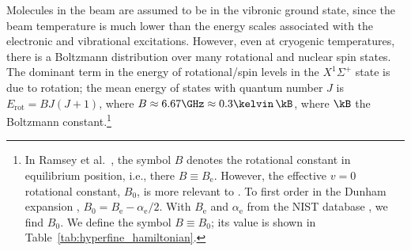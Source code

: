 Molecules in the beam are assumed to be in the vibronic ground state, since the beam temperature is much lower than the energy scales associated with the electronic and vibrational excitations. However, even at cryogenic temperatures, there is a Boltzmann distribution over many rotational and nuclear spin states. The dominant term in the energy of rotational/spin levels in the $X ^1\Sigma^+$ state is due to rotation; the mean energy of states with quantum number $J$ is $E_\mathrm{rot}=BJ(J+1)$, where $B\approx 6.67\GHz \approx 0.3\kelvin\,\kB$, where $\kB$ the Boltzmann constant.\footnote{In Ramsey et al.\ \cite{wilkening1984search}, the symbol $B$ denotes the rotational constant in equilibrium position, i.e., there $B\equiv B_\text{e}$. However, the effective $v=0$ rotational constant, $B_0$, is more relevant to \CENTREX. To first order in the Dunham expansion \cite{huber2013molecular}, $B_0=B_\text{e}-\alpha_\text{e}/2$. With $B_\text{e}$ and $\alpha_\text{e}$ from the NIST database \cite{afeefy2011nist}, we find $B_0$. We define the symbol $B\equiv B_0$; its value is shown in Table~\ref{tab:hyperfine_hamiltonian}.}

